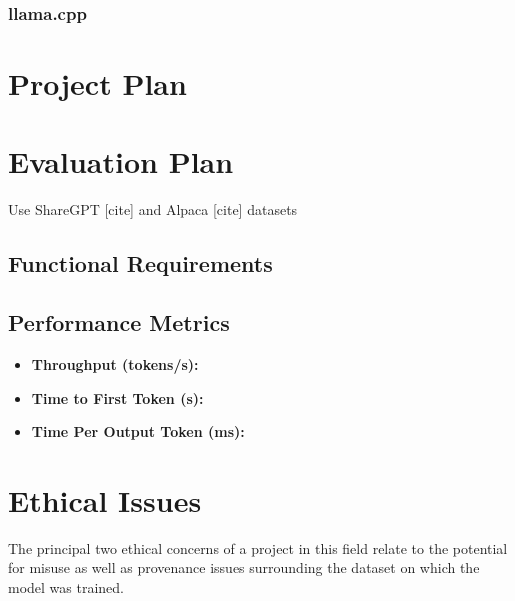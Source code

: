 \documentclass[12pt,twoside]{report}
\begin{document}
\subsection{llama.cpp} \label{section:llamacpp}


\chapter{Project Plan} %
% 

\chapter{Evaluation Plan} %
\begin{comment}
1. Run some benchmark on llama.cpp
2. Run same benchmark on llama.cpp + my system
3. ...
4. Profit???

Key requirements for project

Areas on which I could track performance relative to existing system
- Efficiency (\% of overall resources used)
- Throughput (tokens/sec)

\end{comment}

Use ShareGPT [cite] and Alpaca [cite] datasets

\section{Functional Requirements}
\section{Performance Metrics}
\begin{itemize}
  \item \textbf{Throughput (tokens/s):}
  \item \textbf{Time to First Token (s):}
  \item \textbf{Time Per Output Token (ms):}
\end{itemize}


\chapter{Ethical Issues} %
The principal two ethical concerns of a project in this field relate to the potential for misuse as well as provenance issues surrounding the dataset on which the model was trained.
\end{document}
